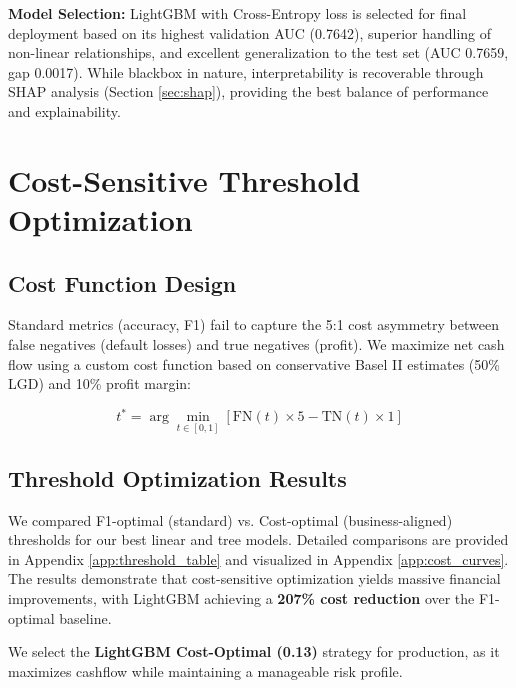 \documentclass[12pt]{article}
\begin{document}
\textbf{Model Selection:} LightGBM with Cross-Entropy loss is selected for final deployment based on its highest validation AUC (0.7642), superior handling of non-linear relationships, and excellent generalization to the test set (AUC 0.7659, gap 0.0017). While blackbox in nature, interpretability is recoverable through SHAP analysis (Section \ref{sec:shap}), providing the best balance of performance and explainability.

\section{Cost-Sensitive Threshold Optimization}

\subsection{Cost Function Design}

Standard metrics (accuracy, F1) fail to capture the 5:1 cost asymmetry between false negatives (default losses) and true negatives (profit). We maximize net cash flow using a custom cost function based on conservative Basel II estimates (50\% LGD) and 10\% profit margin:

\begin{equation}
t^* = \arg\min_{t \in [0,1]} \left[ \text{FN}(t) \times 5 - \text{TN}(t) \times 1 \right]
\end{equation}


\subsection{Threshold Optimization Results}

We compared F1-optimal (standard) vs. Cost-optimal (business-aligned) thresholds for our best linear and tree models. Detailed comparisons are provided in Appendix \ref{app:threshold_table} and visualized in Appendix \ref{app:cost_curves}. The results demonstrate that cost-sensitive optimization yields massive financial improvements, with LightGBM achieving a \textbf{207\% cost reduction} over the F1-optimal baseline.

We select the \textbf{LightGBM Cost-Optimal (0.13)} strategy for production, as it maximizes cashflow while maintaining a manageable risk profile.
\end{document}
